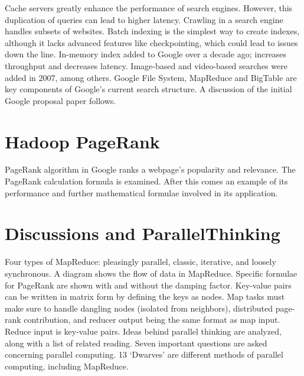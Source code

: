 Cache servers greatly enhance the performance of search engines.
However, this duplication of queries can lead to higher latency.
Crawling in a search engine handles subsets of websites. Batch indexing
is the simplest way to create indexes, although it lacks advanced
features like checkpointing, which could lead to issues down the line.
In-memory index added to Google over a decade ago; increases throughput
and decreases latency. Image-based and video-based searches were added
in 2007, among others. Google File System, MapReduce and BigTable are
key components of Google's current search structure. A discussion of the
initial Google proposal paper follows.




\section{Hadoop PageRank}

PageRank algorithm in Google ranks a webpage's popularity and relevance.
The PageRank calculation formula is examined. After this comes an
example of its performance and further mathematical formulae involved in
its application.




\section{Discussions and ParallelThinking}

Four types of MapReduce: pleasingly parallel, classic, iterative, and
loosely synchronous. A diagram shows the flow of data in MapReduce.
Specific formulae for PageRank are shown with and without the damping
factor. Key-value pairs can be written in matrix form by defining the
keys as nodes. Map tasks must make sure to handle dangling nodes
(isolated from neighbors), distributed page-rank contribution, and
reducer output being the same format as map input. Reduce input is
key-value pairs. Ideas behind parallel thinking are analyzed, along with
a list of related reading. Seven important questions are asked
concerning parallel computing. 13 `Dwarves' are different methods of
parallel computing, including MapReduce.

